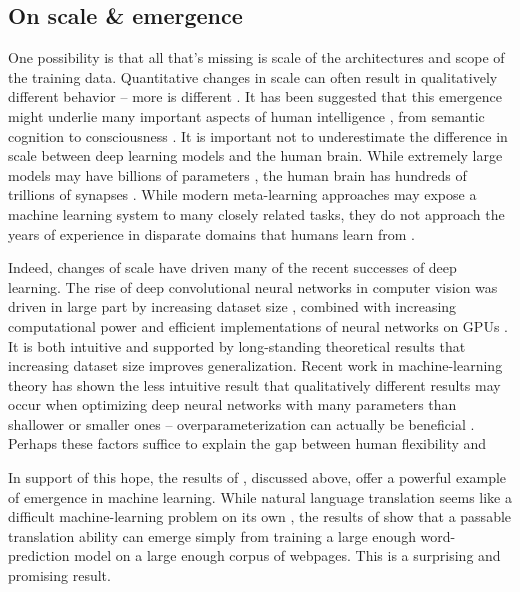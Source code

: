 \subsection{On scale \& emergence}

One possibility is that all that's missing is scale of the architectures and scope of the training data. Quantitative changes in scale can often result in qualitatively different behavior -- more is different \citep{Anderson1972}. It has been suggested that this emergence might underlie many important aspects of human intelligence \citep{McClelland2010a}, from semantic cognition \citep{Rogers2008, Saxe2019} to consciousness \citep{Chalmers2006}. It is important not to underestimate the difference in scale between deep learning models and the human brain. While extremely large models may have billions of parameters \citep[][e.g.]{Radford2019}, the human brain has hundreds of trillions of synapses \citep{Drachman2005}. While modern meta-learning approaches may expose a machine learning system to many closely related tasks, they do not approach the years of experience in disparate domains that humans learn from \citep{Mitchell2018}.\par 
Indeed, changes of scale have driven many of the recent successes of deep learning. The rise of deep convolutional neural networks in computer vision was driven in large part by increasing dataset size \citep{Deng2009}, combined with increasing computational power and efficient implementations of neural networks on GPUs \citep{Krizhevsky2012}. It is both intuitive and supported by long-standing theoretical results \citep{Bartlett2002} that increasing dataset size improves generalization. Recent work in machine-learning theory has shown the less intuitive result that qualitatively different results may occur when optimizing deep neural networks with many parameters than shallower or smaller ones -- overparameterization can actually be beneficial \citep{Dauphin2014, Arora2018a}. Perhaps these factors suffice to explain the gap between human flexibility and \par 
In support of this hope, the results of \citet{Radford2019}, discussed above, offer a powerful example of emergence in machine learning. While natural language translation seems like a difficult machine-learning problem on its own \citep{Wu2016}, the results of \citet{Radford2019} show that a passable translation ability can emerge simply from training a large enough word-prediction model on a large enough corpus of webpages. This is a surprising and promising result. \par 

